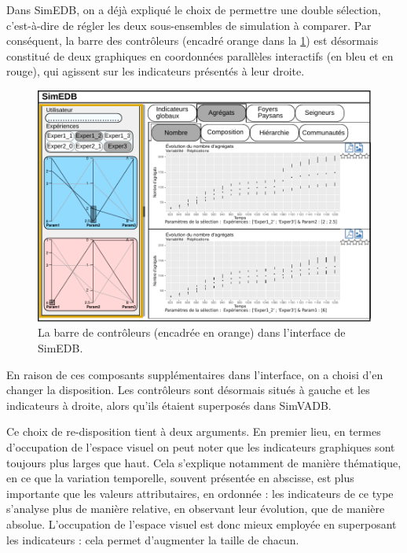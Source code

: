 Dans SimEDB, on a déjà expliqué le choix de permettre une double sélection, c'est-à-dire de régler les deux sous-ensembles de simulation à comparer.
Par conséquent, la barre des contrôleurs (encadré orange dans la \cref{fig:simedb-sidebar}) est désormais constitué de deux graphiques en coordonnées parallèles interactifs (en bleu et en rouge), qui agissent sur les indicateurs présentés à leur droite.

\begin{figure}[H]
	\centering
	\includegraphics[width=\linewidth]{img/mockup_SimEDB_controleurs.pdf}
	\caption{La barre de contrôleurs (encadrée en orange) dans l'interface de SimEDB.}
	\label{fig:simedb-sidebar}
\end{figure}

En raison de ces composants supplémentaires dans l'interface, on a choisi d'en changer la disposition. Les contrôleurs sont désormais situés à gauche et les indicateurs à droite, alors qu'ils étaient superposés dans SimVADB.

Ce choix de re-disposition tient à deux arguments.
En premier lieu, en termes d'occupation de l'espace visuel on peut noter que les indicateurs graphiques sont toujours plus larges que haut.
Cela s'explique notamment de manière thématique, en ce que la variation temporelle, souvent présentée en abscisse, est plus importante que les valeurs attributaires, en ordonnée : les indicateurs de ce type s'analyse plus de manière relative, en observant leur évolution, que de manière absolue.
L'occupation de l'espace visuel est donc mieux employée en superposant les indicateurs : cela permet d'augmenter la taille de chacun.

